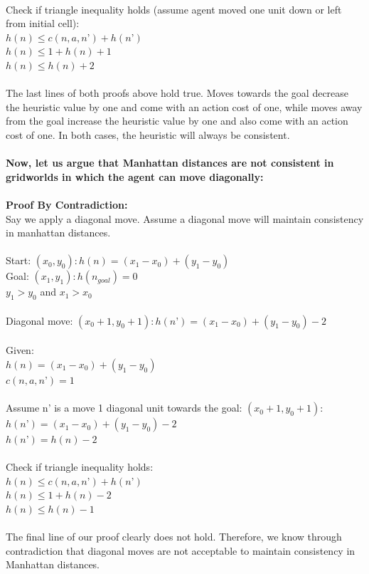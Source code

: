 \documentclass[12pt, letterpaper]{article}
\begin{document}
\\Check if triangle inequality holds (assume agent moved one unit down or left from initial cell):
\\
\(h(n) \le c(n, a, n’) + h(n’)\)
\\
\(h(n) \le 1 + h(n) + 1\)
\\
\(h(n) \le h(n) + 2\)
\\
\\The last lines of both proofs above hold true. Moves towards the goal decrease the heuristic value by one and come with an action cost of one, while moves away from the goal increase the heuristic value by one and also come with an action cost of one. In both cases, the heuristic will always be consistent.
\\~\\
\textbf{Now, let us argue that Manhattan distances are not consistent in gridworlds in which the agent can move diagonally:}
\\
\\\textbf{Proof By Contradiction:}
\\Say we apply a diagonal move. Assume a diagonal move will maintain consistency in manhattan distances.
\\
\\Start: \((x_0, y_0): h(n) =  (x_1 - x_0) + (y_1 - y_0)\)
\\Goal: \((x_1, y_1): h(n_{goal}) = 0\)
\\\(y_1  > y_0 \) and \( x_1 > x_0\)
\\~\\
Diagonal move: \((x_0 + 1, y_0 + 1): h(n’) = (x_1 - x_0) + (y_1 - y_0) - 2\)
\\~\\
Given:
\\\(h(n) = (x_1 - x_0) + (y_1 - y_0)\)
\\\(c(n, a, n’) = 1\)
\\~\\
Assume n’ is a move 1 diagonal unit towards the goal: \((x_0 + 1, y_0 + 1)\):
\\\(h(n’) = (x_1 - x_0) + (y_1 - y_0) - 2\)
\\\(h(n’) = h(n) - 2\)
\\~\\
Check if triangle inequality holds:
\\
\(h(n) \le c(n, a, n’) + h(n’)\)
\\
\(h(n) \le 1 + h(n) - 2\)
\\
\(h(n) \le h(n) - 1\)
\\
\\The final line of our proof clearly does not hold. Therefore, we know through contradiction that diagonal moves are not acceptable to maintain consistency in Manhattan distances.
\end{document}
